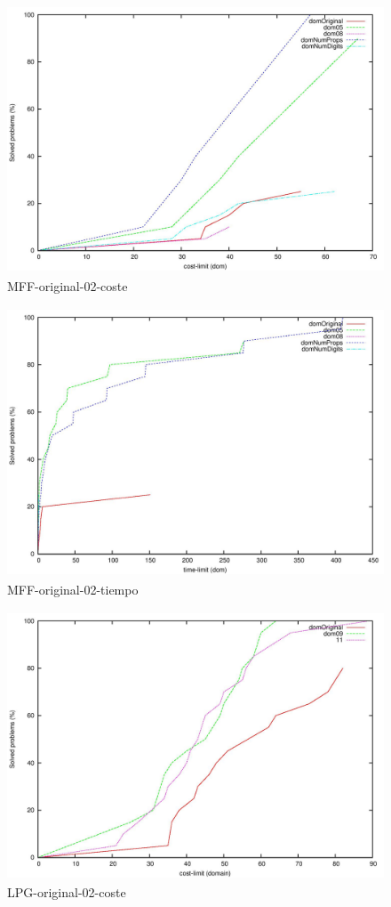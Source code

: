 \documentclass{article}
\begin{document}
    \begin{figure}[H]
        \centering
        \includegraphics[width=12cm, height=8cm]{mff-or-05-08-prop-digit-cost}
        \caption{MFF-original-02-coste}
    \end{figure}
    
    \begin{figure}[H]
        \centering
        \includegraphics[width=12cm, height=8cm]{mff-or-05-08-prop-digit-time}
        \caption{MFF-original-02-tiempo}
    \end{figure}
    
    \begin{figure}[H]
        \centering
        \includegraphics[width=12cm, height=8cm]{lpg-or-05-08-prop-digit-cost}
        \caption{LPG-original-02-coste}
    \end{figure}
    
\end{document}

